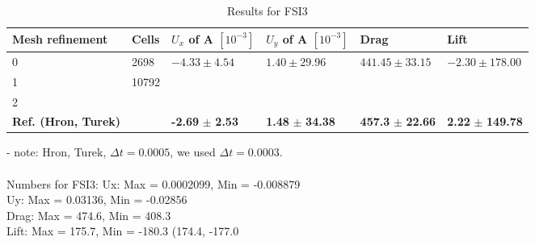 \begin{table}[!ht]
  \begin{center}
  \begin{tabular}{l | l | l | l | l | l} \hline
	Mesh refinement & Cells & $U_x$ of A $[10^{-3}]$ & $U_y$ of A $[10^{-3}]$ & Drag & Lift\\ \hline
    0  & 2698 & $ -4.33 \pm 4.54$ & $ 1.40 \pm 29.96$ & $441.45 \pm 33.15 $ & $-2.30 \pm 178.00$\\   \hline
    1 & 10792 & $ $&  $ $ & $ $ & $ $\\ \hline
    2 &  & $ $&  $ $ & $ $ & $ $   \\ \hline \hline
    \textbf{Ref. (Hron, Turek)}  & & \textbf{-2.69} $\pm$ \textbf{2.53} & \textbf{1.48} $\pm$ \textbf{34.38} & \textbf{457.3} $\pm$ \textbf{22.66} & \textbf{2.22} $\pm$ \textbf{149.78}\\ \hline 
    \hline

  \end{tabular}
	  \caption{Results for FSI3}
  \end{center}
\end{table}
- note: Hron, Turek, $\Delta t = 0.0005$, we used $\Delta t = 0.0003$. \\ \\
Numbers for FSI3:
Ux: Max = 0.0002099, Min = -0.008879 \\
Uy: Max = 0.03136, Min = -0.02856 \\
Drag: Max = 474.6, Min = 408.3 \\
Lift: Max = 175.7, Min = -180.3 (174.4, -177.0\\

